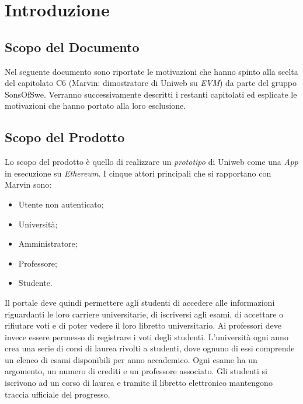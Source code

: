 \section{Introduzione}
\subsection{Scopo del Documento}
	Nel seguente documento sono riportate le motivazioni che hanno spinto alla scelta del capitolato C6 (Marvin: dimostratore di Uniweb su \textit{EVM}) da parte del gruppo SonsOfSwe. Verranno successivamente descritti i restanti capitolati ed esplicate le motivazioni che hanno portato alla loro esclusione.
	
\subsection{Scopo del Prodotto}
	\begin{comment}
	Il progetto Marvin si pone l'obiettivo di realizzare un sottoinsieme di funzionalità del portale Uniweb come una \textit{ÐApp}\ped{G} (Decentralized Applications, cioè applicazioni  che usano \textit{smart contracts}\ped{G}) in esecuzione su EVM.
	\end{comment}
	Lo scopo del prodotto è quello di realizzare un \emph{prototipo} di Uniweb come una \emph{\DJ App} in esecuzione su \emph{Ethereum}. I cinque attori principali che si rapportano con Marvin sono:
	\begin{itemize}
		\item Utente non autenticato; 
		\item Università;
		\item Amministratore;
		\item Professore;
		\item Studente.
	\end{itemize} 
	Il portale deve quindi permettere agli studenti di accedere alle informazioni riguardanti le loro carriere universitarie, di iscriversi agli esami, di accettare o rifiutare voti e di poter vedere il loro libretto universitario.
	Ai professori deve invece essere permesso di registrare i voti degli studenti.
	L'università ogni anno crea una serie di corsi di laurea rivolti a studenti, dove ognuno di essi comprende un elenco di esami disponibili per anno accademico. Ogni esame ha un argomento, un numero di crediti e un professore associato. Gli studenti si iscrivono ad un corso di laurea e tramite il libretto elettronico mantengono traccia ufficiale del progresso.
	
